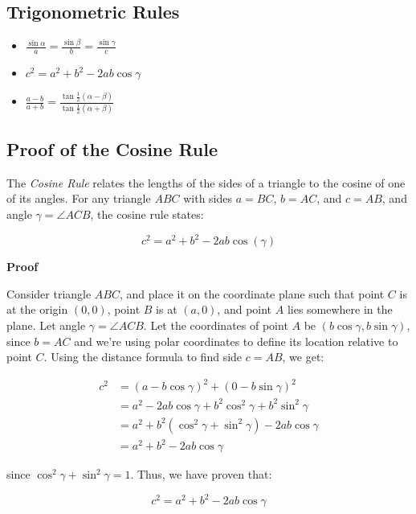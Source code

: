 \subsection{Trigonometric Rules}

\begin{itemize}[label =\(-\)]
	\item \(\frac{\sin \alpha}{a} = \frac{\sin \beta}{b} = \frac{\sin \gamma}{c}\)
	\item \(c^2 = a^2 + b^2 - 2ab \cos \gamma\)
	\item \(\frac{a - b}{a + b} = \frac{\tan \frac{1}{2}(\alpha - \beta)}{\tan \frac{1}{2} (\alpha + \beta)}\)
\end{itemize}

\subsection{Proof of the Cosine Rule}

The \emph{Cosine Rule} relates the lengths of the sides of a triangle to the cosine of one of its angles. For any triangle \( ABC \) with sides \( a = BC \), \( b = AC \), and \( c = AB \), and angle \( \gamma = \angle ACB \), the cosine rule states:

\[
c^2 = a^2 + b^2 - 2ab\cos(\gamma)
\]

\textbf{Proof}

Consider triangle \( ABC \), and place it on the coordinate plane such that point \( C \) is at the origin \( (0,0) \), point \( B \) is at \( (a,0) \), and point \( A \) 
lies somewhere in the plane. Let angle \( \gamma = \angle ACB \).
\newline
Let the coordinates of point \( A \) be \( (b\cos\gamma, b\sin\gamma) \), since \( b = AC \) and we’re using polar coordinates to define its location relative to point \( C \).
\newline
Using the distance formula to find side \( c = AB \), we get:

\begin{align*}
c^2 &= {(a - b\cos\gamma)}^2 + {(0 - b\sin\gamma)}^2 \\
&= a^2 - 2ab\cos\gamma + b^2\cos^2\gamma + b^2\sin^2\gamma \\
&= a^2 + b^2(\cos^2\gamma + \sin^2\gamma) - 2ab\cos\gamma \\
&= a^2 + b^2 - 2ab\cos\gamma
\end{align*}

since \( \cos^2\gamma + \sin^2\gamma = 1 \).
\newline
Thus, we have proven that:

\[
c^2 = a^2 + b^2 - 2ab\cos\gamma
\]

\QED